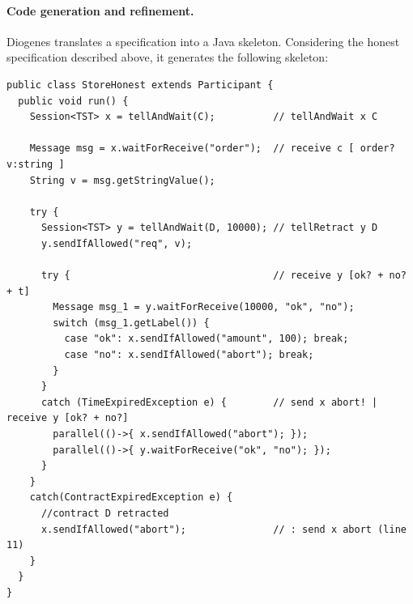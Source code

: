 \paragraph{Code generation and refinement.}
Diogenes translates a \coco specification
into a Java skeleton.
Considering the honest specification described above,
it generates the following skeleton:
\begin{mdframed}
  \begin{verbatim}
public class StoreHonest extends Participant { 
  public void run() {
    Session<TST> x = tellAndWait(C);          // tellAndWait x C
    
    Message msg = x.waitForReceive("order");  // receive c [ order? v:string ]
    String v = msg.getStringValue();
    
    try {
      Session<TST> y = tellAndWait(D, 10000); // tellRetract y D
      y.sendIfAllowed("req", v);
      
      try {                                   // receive y [ok? + no? + t]
        Message msg_1 = y.waitForReceive(10000, "ok", "no");
        switch (msg_1.getLabel()) {                    
          case "ok": x.sendIfAllowed("amount", 100); break;
          case "no": x.sendIfAllowed("abort"); break;                    
        }
      }
      catch (TimeExpiredException e) {        // send x abort! | receive y [ok? + no?] 
        parallel(()->{ x.sendIfAllowed("abort"); });
        parallel(()->{ y.waitForReceive("ok", "no"); });
      }            
    }
    catch(ContractExpiredException e) {
      //contract D retracted
      x.sendIfAllowed("abort");               // : send x abort (line 11)
    } 
  }
}
  \end{verbatim}
\end{mdframed}

